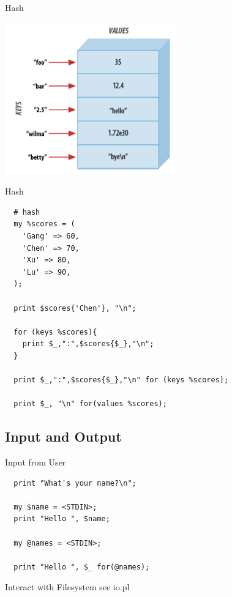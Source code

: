 \documentclass[UTF8]{beamer}
\begin{document}
\begin{frame}[t]{Hash}
  \centerline{\includegraphics[height=.6\textheight]{hash.png}}
\end{frame}

\begin{frame}[fragile]{Hash}
\begin{verbatim}
  # hash
  my %scores = (
    'Gang' => 60,
    'Chen' => 70,
    'Xu' => 80,
    'Lu' => 90,
  );

  print $scores{'Chen'}, "\n";

  for (keys %scores){
    print $_,":",$scores{$_},"\n";
  }

  print $_,":",$scores{$_},"\n" for (keys %scores);

  print $_, "\n" for(values %scores);
\end{verbatim}
\end{frame}

\subsection{Input and Output}

\begin{frame}[fragile]{Input from User}
\begin{verbatim}
  print "What's your name?\n";

  my $name = <STDIN>;
  print "Hello ", $name;

  my @names = <STDIN>;

  print "Hello ", $_ for(@names);
\end{verbatim}
\end{frame}

\begin{frame}[fragile]{Interact with Filesystem}
  see io.pl
\end{frame}
\end{document}

